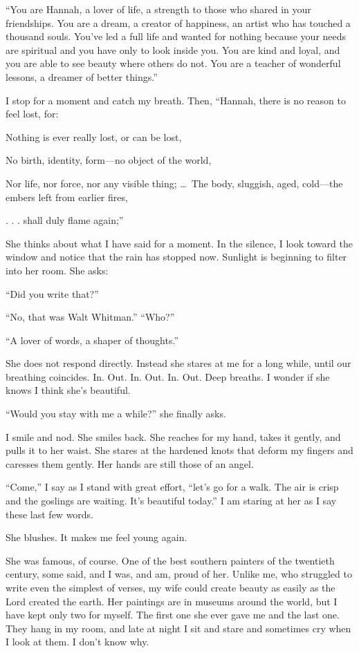 \documentclass[10pt, twoside, openright]{book}
\begin{document}
``You are Hannah, a lover of life, a strength to those who shared in
your friendships. You are a dream, a creator of happiness, an artist who
has touched a thousand souls. You've led a full life and wanted for
nothing because your needs are spiritual and you have only to look
inside you. You are kind and loyal, and you are able to see beauty where
others do not. You are a teacher of wonderful lessons, a dreamer of
better things.''

I stop for a moment and catch my breath. Then, ``Hannah, there is no
reason to feel lost, for:


Nothing is ever really lost, or can be lost,

No birth, identity, form---no object of the world,

Nor life, nor force, nor any visible thing;   \dots\ The body, sluggish,
aged, cold---the embers left from earlier fires,

. . . shall duly flame again;''


She thinks about what I have said for a moment. In the silence, I look
toward the window and notice that the rain has stopped now. Sunlight is
beginning to filter into her room. She asks:


``Did you write that?''

``No, that was Walt Whitman.'' ``Who?''

``A lover of words, a shaper of thoughts.''


She does not respond directly. Instead she stares at me for a long
while, until our breathing coincides. In. Out. In. Out. In. Out. Deep
breaths. I wonder if she knows I think she's beautiful.


``Would you stay with me a while?'' she finally asks.


I smile and nod. She smiles back. She reaches for my hand, takes it
gently, and pulls it to her waist. She stares at the hardened knots that
deform my fingers and caresses them gently. Her hands are still those of
an angel.

``Come,'' I say as I stand with great effort, ``let's go for a walk. The
air is crisp and the goslings are waiting. It's beautiful today.'' I am
staring at her as I say these last few words.


She blushes. It makes me feel young again.


She was famous, of course. One of the best southern painters of the
twentieth century, some said, and I was, and am, proud of her. Unlike
me, who struggled to write even the simplest of verses, my wife could
create beauty as easily as the Lord created the earth. Her paintings are
in museums around the world, but I have kept only two for myself. The
first one she ever gave me and the last one. They hang in my room, and
late at night I sit and stare and sometimes cry when I look at them. I
don't know why.
\end{document}
